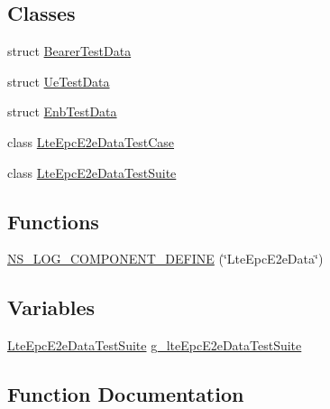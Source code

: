 \subsection*{Classes}
\begin{DoxyCompactItemize}
\item 
struct \hyperlink{structBearerTestData}{Bearer\+Test\+Data}
\item 
struct \hyperlink{structUeTestData}{Ue\+Test\+Data}
\item 
struct \hyperlink{structEnbTestData}{Enb\+Test\+Data}
\item 
class \hyperlink{classLteEpcE2eDataTestCase}{Lte\+Epc\+E2e\+Data\+Test\+Case}
\item 
class \hyperlink{classLteEpcE2eDataTestSuite}{Lte\+Epc\+E2e\+Data\+Test\+Suite}
\end{DoxyCompactItemize}
\subsection*{Functions}
\begin{DoxyCompactItemize}
\item 
\hyperlink{test-lte-epc-e2e-data_8cc_a7aeb398a98a9293ea380a93e84506948}{N\+S\+\_\+\+L\+O\+G\+\_\+\+C\+O\+M\+P\+O\+N\+E\+N\+T\+\_\+\+D\+E\+F\+I\+NE} (\char`\"{}Lte\+Epc\+E2e\+Data\char`\"{})
\end{DoxyCompactItemize}
\subsection*{Variables}
\begin{DoxyCompactItemize}
\item 
\hyperlink{classLteEpcE2eDataTestSuite}{Lte\+Epc\+E2e\+Data\+Test\+Suite} \hyperlink{test-lte-epc-e2e-data_8cc_ae5c591b180fa12939b89c44d256c3cbd}{g\+\_\+lte\+Epc\+E2e\+Data\+Test\+Suite}
\end{DoxyCompactItemize}


\subsection{Function Documentation}
